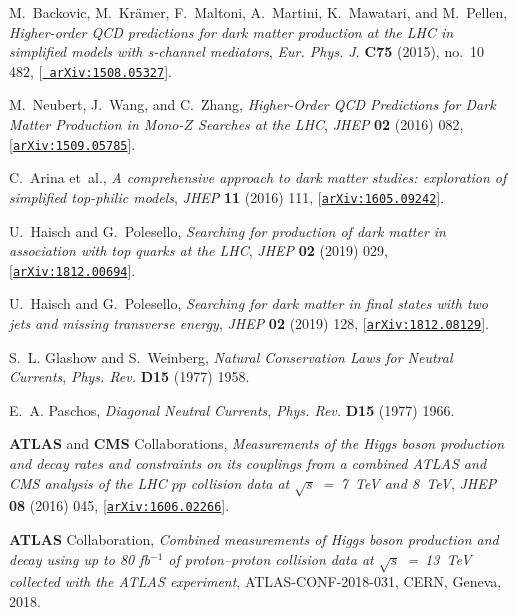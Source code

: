 \documentclass[review]{elsarticle}
\begin{document}
\begin{thebibliography}{100}
M.~Backovic, M.~Kr{\"a}mer, F.~Maltoni, A.~Martini, K.~Mawatari, and M.~Pellen,
  {\it {Higher-order QCD predictions for dark matter production at the LHC in
  simplified models with s-channel mediators}},  {\em Eur. Phys. J.} {\bf C75}
  (2015), no.~10 482, [\href{http://arxiv.org/abs/1508.05327}{{\tt
  arXiv:1508.05327}}].

M.~Neubert, J.~Wang, and C.~Zhang, {\it {Higher-Order QCD Predictions for Dark
  Matter Production in Mono-$Z$ Searches at the LHC}},  {\em JHEP} {\bf 02}
  (2016) 082, [\href{http://arxiv.org/abs/1509.05785}{{\tt arXiv:1509.05785}}].

C.~Arina et~al., {\it {A comprehensive approach to dark matter studies:
  exploration of simplified top-philic models}},  {\em JHEP} {\bf 11} (2016)
  111, [\href{http://arxiv.org/abs/1605.09242}{{\tt arXiv:1605.09242}}].
  
U.~Haisch and G.~Polesello, {\it {Searching for production of dark matter in
  association with top quarks at the LHC}},  {\em JHEP} {\bf 02} (2019) 029,
  [\href{http://arxiv.org/abs/1812.00694}{{\tt arXiv:1812.00694}}].

U.~Haisch and G.~Polesello, {\it {Searching for dark matter in final states
  with two jets and missing transverse energy}},  {\em JHEP} {\bf 02} (2019)
  128, [\href{http://arxiv.org/abs/1812.08129}{{\tt arXiv:1812.08129}}].  

S.~L. Glashow and S.~Weinberg, {\it {Natural Conservation Laws for Neutral
  Currents}},  {\em Phys. Rev.} {\bf D15} (1977) 1958.

E.~A. Paschos, {\it {Diagonal Neutral Currents}},  {\em Phys. Rev.} {\bf D15}
  (1977) 1966.

{\bf ATLAS} and {\bf CMS} Collaborations, {\it {Measurements of the Higgs
  boson production and decay rates and constraints on its couplings from a
  combined ATLAS and CMS analysis of the LHC $pp$ collision data at $ \sqrt{s}$~=~7~TeV
  and 8~TeV}},  {\em JHEP} {\bf 08} (2016) 045,
  [\href{http://arxiv.org/abs/1606.02266}{{\tt arXiv:1606.02266}}].

{\bf ATLAS} Collaboration, {\it {Combined measurements of Higgs boson
  production and decay using up to 80 fb$^{-1}$ of proton--proton collision
  data at $\sqrt{s}$~=~13~TeV collected with the ATLAS experiment}},  
  ATLAS-CONF-2018-031, CERN, Geneva, 2018.


\end{thebibliography}
\end{document}
